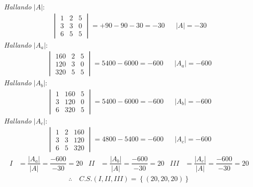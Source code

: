 \documentclass[11pt, a4paper]{article}
\begin{document}
    \textit{Hallando} $|A|$:
    \begin{align*}
      \begin{vmatrix}
        1 & 2 & 5\\
        3 & 3 & 0\\
        6 & 5 & 5
      \end{vmatrix} = +90-90-30 = -30&&|A| = -30
    \end{align*}
    \textit{Hallando} $|A_a|$:
    \begin{align*}
      \begin{vmatrix}
        160 & 2 & 5\\
        120 & 3 & 0\\
        320 & 5 & 5
      \end{vmatrix} = 5400-6000 = -600&&|A_a| = -600
    \end{align*}
    \textit{Hallando} $|A_b|$:
    \begin{align*}
      \begin{vmatrix}
        1 & 160 & 5\\
        3 & 120 & 0\\
        6 & 320 & 5
      \end{vmatrix} = 5400-6000 = -600&&|A_b| = -600
    \end{align*}
    \textit{Hallando} $|A_c|$:
    \begin{align*}
      \begin{vmatrix}
        1 & 2 & 160\\
        3 & 3 & 120\\
        6 & 5 & 320
      \end{vmatrix} = 4800-5400 = -600&&|A_c| = -600
    \end{align*}
    \begin{align*}
      I &= \dfrac{|A_a|}{|A|} = \dfrac{-600}{-30} = 20&
      II &= \dfrac{|A_b|}{|A|} = \dfrac{-600}{-30} = 20&
      III &= \dfrac{|A_c|}{|A|} = \dfrac{-600}{-30} = 20
    \end{align*}
    \begin{align*}
      \therefore \ &C.S. \left(I,II,III\right) = \left\{\left(20,20,20\right)\right\}
    \end{align*}
\end{document}
